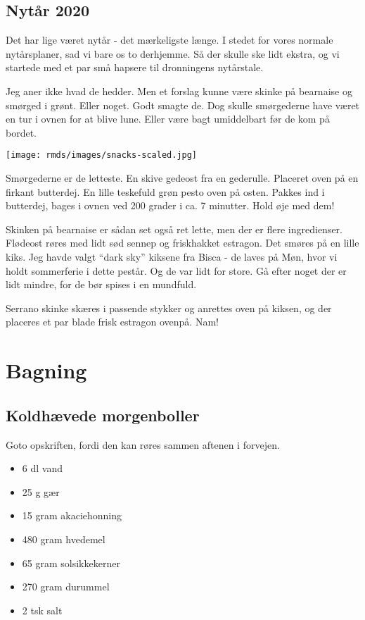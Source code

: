 \documentclass[
  letterpaper,
  DIV=11,
  numbers=noendperiod]{scrreprt}
\providecommand{\tightlist}{%
  \setlength{\itemsep}{0pt}\setlength{\parskip}{0pt}}\usepackage{longtable,booktabs,array}
\begin{document}
\hypertarget{nytuxe5r-2020}{%
\section{Nytår 2020}\label{nytuxe5r-2020}}

Det har lige været nytår - det mærkeligste længe. I stedet for vores
normale nytårsplaner, sad vi bare os to derhjemme. Så der skulle ske
lidt ekstra, og vi startede med et par små hapsere til dronningens
nytårstale.

Jeg aner ikke hvad de hedder. Men et forslag kunne være skinke på
bearnaise og smørged i grønt. Eller noget. Godt smagte de. Dog skulle
smørgederne have været en tur i ovnen for at blive lune. Eller være bagt
umiddelbart før de kom på bordet.

\texttt{[image: rmds/images/snacks-scaled.jpg]}

Smørgederne er de letteste. En skive gedeost fra en gederulle. Placeret
oven på en firkant butterdej. En lille teskefuld grøn pesto oven på
osten. Pakkes ind i butterdej, bages i ovnen ved 200 grader i ca. 7
minutter. Hold øje med dem!

Skinken på bearnaise er sådan set også ret lette, men der er flere
ingredienser. Flødeost røres med lidt sød sennep og friskhakket
estragon. Det smøres på en lille kiks. Jeg havde valgt ``dark sky''
kiksene fra Bisca - de laves på Møn, hvor vi holdt sommerferie i dette
pestår. Og de var lidt for store. Gå efter noget der er lidt mindre, for
de bør spises i en mundfuld.

Serrano skinke skæres i passende stykker og anrettes oven på kiksen, og
der placeres et par blade frisk estragon ovenpå. Nam!


\hypertarget{bagning-1}{%
\chapter{Bagning}\label{bagning-1}}

\hypertarget{koldhuxe6vede-morgenboller-1}{%
\section{Koldhævede morgenboller}\label{koldhuxe6vede-morgenboller-1}}

Goto opskriften, fordi den kan røres sammen aftenen i forvejen.

\begin{itemize}
\tightlist
\item
  6 dl vand
\item
  25 g gær
\item
  15 gram akaciehonning
\item
  480 gram hvedemel
\item
  65 gram solsikkekerner
\item
  270 gram durummel
\item
  2 tsk salt
\end{itemize}
\end{document}
